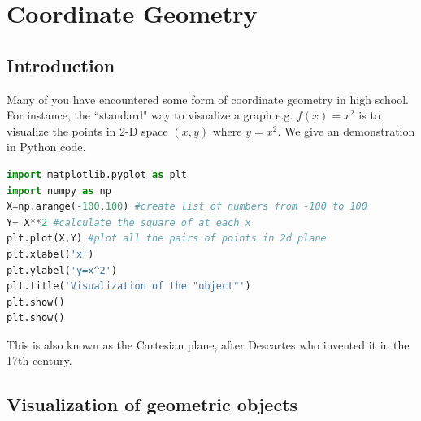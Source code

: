\chapter{Coordinate Geometry}
\setcounter{exercisecounter}{0}

\setcounter{thmcounter}{1}
\section{Introduction}
Many of you have encountered some form of coordinate geometry in high school. For instance, the ``standard" way to visualize a graph e.g. $f(x)=x^2$ is to visualize the points in 2-D space $(x,y)$ where $y=x^2$. We give an demonstration in Python code.

\begin{lstlisting}[language=Python]
import matplotlib.pyplot as plt
import numpy as np
X=np.arange(-100,100) #create list of numbers from -100 to 100
Y= X**2 #calculate the square of at each x
plt.plot(X,Y) #plot all the pairs of points in 2d plane
plt.xlabel('x')
plt.ylabel('y=x^2')
plt.title('Visualization of the "object"')
plt.show()
plt.show()
\end{lstlisting}


This is also known as the Cartesian plane, after Descartes who invented it in the 17th century.\\
\section{Visualization of geometric objects}

